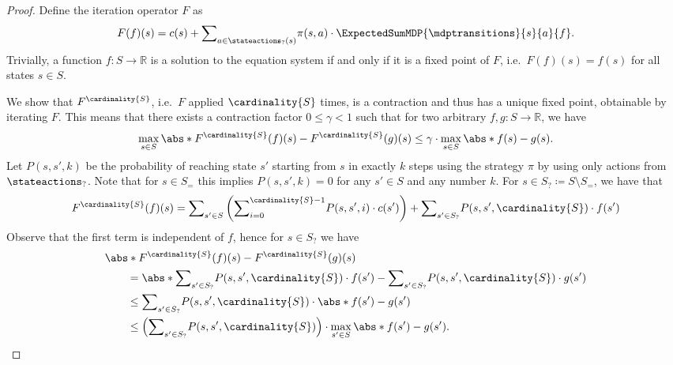 \documentclass{theoretics}
\newcommand{\Reals}{\mathbb{R}}
\newcommand{\States}{S}
\newcommand{\strategy}{\pi}
\begin{document}
\begin{proof}
	Define the iteration operator $F$ as
	\begin{align*}
		F(f)(s) = c(s) + {\sum}_{a \in \stateactions_?(s)} \strategy(s, a) \cdot \ExpectedSumMDP{\mdptransitions}{s}{a}{f}.
	\end{align*}
	Trivially, a function $f : \States \to \Reals$ is a solution to the equation system if and only if it is a fixed point of $F$, i.e.\ $F(f)(s) = f(s)$ for all states $s \in \States$.

	We show that $F^{\cardinality{\States}}$, i.e.\ $F$ applied $\cardinality{S}$ times, is a contraction and thus has a unique fixed point, obtainable by iterating $F$.
	This means that there exists a contraction factor $0 \leq \gamma < 1$ such that for two arbitrary $f, g : \States \to \Reals$, we have
	\begin{equation}
		\max_{s \in \States} \abs*{F^{\cardinality{\States}}(f)(s) - F^{\cardinality{\States}}(g)(s)} \leq \gamma \cdot \max_{s \in \States} \abs*{f(s) - g(s)}. \label{eq:stm:bellman_unique_solution:contraction}
	\end{equation}
	Let $P(s, s', k)$ be the probability of reaching state $s'$ starting from $s$ in exactly $k$ steps using the strategy $\strategy$ by using only actions from $\stateactions_?$.
	Note that for $s \in \States_=$ this implies $P(s, s', k) = 0$ for any $s' \in \States$ and any number $k$.
	For $s \in \States_? \coloneqq \States \setminus \States_=$, we have that
	\begin{equation*}
		F^{\cardinality{S}}(f)(s) = {\sum}_{s' \in \States} \left( {\sum}_{i = 0}^{\cardinality{S} - 1} P(s, s', i) \cdot c(s') \right) + {\sum}_{s' \in \States_?} P(s, s', \cardinality{S}) \cdot f(s')
	\end{equation*}
	Observe that the first term is independent of $f$, hence for $s \in S_?$ we have
	\begin{align*}
		& \abs*{F^{\cardinality{\States}}(f)(s) - F^{\cardinality{\States}}(g)(s)} \\
		& \qquad = \abs*{{\sum}_{s' \in \States_?} P(s, s', \cardinality{S}) \cdot f(s') - {\sum}_{s' \in \States_?} P(s, s', \cardinality{S}) \cdot g(s')} \\
		& \qquad \leq {\sum}_{s' \in \States_?} P(s, s', \cardinality{S}) \cdot \abs*{f(s') - g(s')} \\
		& \qquad \leq \left( {\sum}_{s' \in \States_?} P(s, s', \cardinality{S})  \right) \cdot \max_{s' \in \States} \abs*{f(s') - g(s')}.
	\end{align*}

\end{proof}
\end{document}
